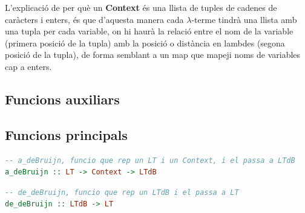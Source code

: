 \documentclass[10pt,a4paper]{article}
\begin{document}
L'explicació de per què un \textbf{Context} és una llista de tuples de cadenes de caràcters i enters, és que d'aquesta manera cada $\lambda$-terme tindrà una llista amb una tupla per cada variable, on hi haurà la relació entre el nom de la variable (primera posició de la tupla) amb la posició o distància en lambdes (segona posició de la tupla), de forma semblant a un map que mapeji noms de variables cap a enters.

\clearpage

\subsection{Funcions auxiliars}

\clearpage

\subsection{Funcions principals}

\begin{lstlisting}[language=Haskell]
-- a_deBruijn, funcio que rep un LT i un Context, i el passa a LTdB
a_deBruijn :: LT -> Context -> LTdB
\end{lstlisting}

\begin{lstlisting}[language=Haskell]
-- de_deBruijn, funcio que rep un LTdB i el passa a LT
de_deBruijn :: LTdB -> LT
\end{lstlisting}
\end{document}
